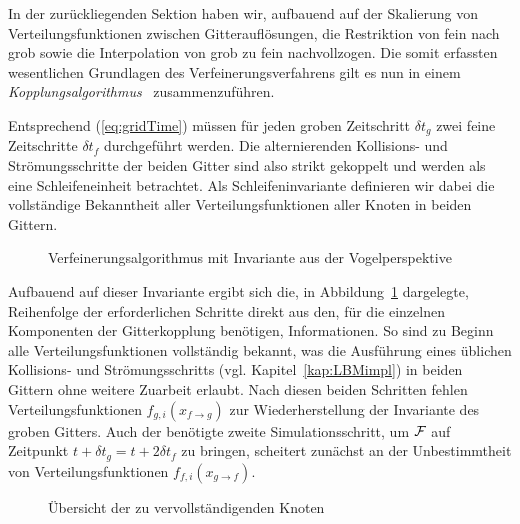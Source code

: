 In der zurückliegenden Sektion haben wir, aufbauend auf der Skalierung von Verteilungsfunktionen zwischen Gitterauflösungen, die Restriktion von fein nach grob sowie die Interpolation von grob zu fein nachvollzogen. Die somit erfassten wesentlichen Grundlagen des Verfeinerungsverfahrens gilt es nun in einem \emph{Kopplungsalgorithmus}~\cite[Kap.~3.5]{lagrava12} zusammenzuführen.

\bigskip

Entsprechend (\ref{eq:gridTime}) müssen für jeden groben Zeitschritt \(\delta t_g\) zwei feine Zeitschritte \(\delta t_f\) durchgeführt werden. Die alternierenden Kollisions- und Strömungsschritte der beiden Gitter sind also strikt gekoppelt und werden als eine Schleifeneinheit betrachtet. Als Schleifeninvariante definieren wir dabei die vollständige Bekanntheit aller Verteilungsfunktionen aller Knoten in beiden Gittern.

\begin{figure}[h]

\caption{Verfeinerungsalgorithmus mit Invariante aus der Vogelperspektive}
\label{fig:AlgorithmBirdsEye}
\end{figure}
\noindent
Aufbauend auf dieser Invariante ergibt sich die, in Abbildung~\ref{fig:AlgorithmBirdsEye} dargelegte, Reihenfolge der erforderlichen Schritte direkt aus den, für die einzelnen Komponenten der Gitterkopplung benötigen, Informationen. So sind zu Beginn alle Verteilungsfunktionen vollständig bekannt, was die Ausführung eines üblichen Kollisions- und Strömungsschritts (vgl. Kapitel~\ref{kap:LBMimpl}) in beiden Gittern ohne weitere Zuarbeit erlaubt. Nach diesen beiden Schritten fehlen Verteilungsfunktionen \(f_{g,i}(x_{f \to g})\) zur Wiederherstellung der Invariante des groben Gitters. Auch der benötigte zweite Simulationsschritt, um \(\mathcal{F}\) auf Zeitpunkt \(t+\delta t_g=t+2\delta t_f\) zu bringen, scheitert zunächst an der Unbestimmtheit von Verteilungsfunktionen \(f_{f,i}(x_{g \to f})\).

\begin{figure}[h]
\centering

\caption{Übersicht der zu vervollständigenden Knoten}
\end{figure}

